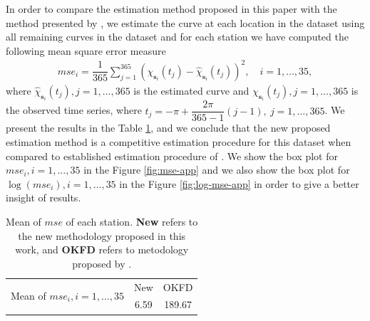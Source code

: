 \documentclass[12pt]{interact}
\theoremstyle{plain}%
\theoremstyle{definition}
\theoremstyle{remark}
\begin{document}
In order to compare the estimation method proposed in this paper with the method presented by \citet{giraldo2011ordinary}, we estimate the curve at each location in the dataset using all remaining curves in the dataset and for each station we have computed the following mean square error measure
\begin{align*}
mse_i = \dfrac{1}{365} \sum_{j=1}^{365} (\chi_{\bm{s}_i}(t_j) - \hat\chi_{\bm{s}_i}(t_j))^2, \quad i =1, \dots, 35,
\end{align*}
where \(\hat\chi_{\bm{s}_i}(t_j), j=1, \dots, 365\) is the estimated curve and \(\chi_{\bm{s}_i}(t_j), j=1, \dots, 365\) is the observed time series,
where \(t_j = -\pi + \dfrac{2\pi}{365-1}(j-1),\ j=1,\dots, 365\).
We present the results in the Table \ref{tab:error}, and we conclude that the new proposed estimation method is a competitive estimation procedure for this dataset when compared to established estimation procedure of
\citet{giraldo2011ordinary}. We show the box plot for \(mse_i, i=1, \dots, 35\) in the Figure \ref{fig:mse-app} and we also show the box plot for \(\log(mse_i), i=1, \dots, 35\) in the Figure \ref{fig:log-mse-app} in order to give a better insight of results.

\begin{table}[p]
	\centering
	\caption{Mean of $mse$ of each station. \textbf{New} refers to the new methodology proposed in this work, and \textbf{OKFD} refers to metodology proposed by \cite{giraldo2011ordinary}.}
	\begin{tabular}{lcc}
		\toprule
		\multirow{2}{*}{Mean of $mse_i, i=1,\dots, 35$} & New   & OKFD \\ \cmidrule{2-3}
		& 6.59  & 189.67 \\ \bottomrule
	\end{tabular}
	\label{tab:error}
\end{table}
\end{document}

